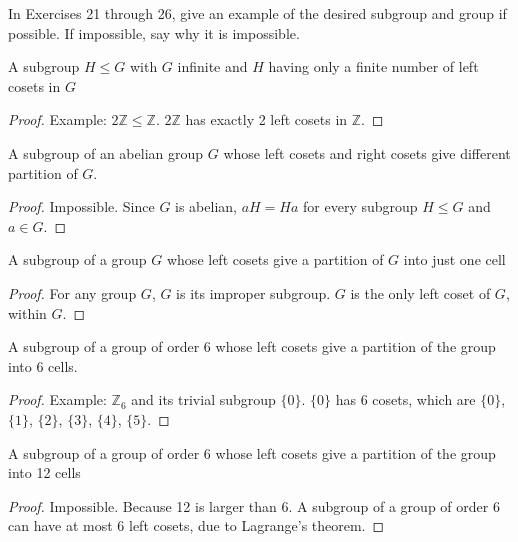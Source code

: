 In Exercises 21 through 26, give an example of the desired subgroup and group if possible. If impossible, say why
it is impossible.

\begin{exercise}
    A subgroup $H\leq G$ with $G$ infinite and $H$ having only a finite number of left cosets in $G$
\end{exercise}

\begin{proof}
    Example: $2\mathbb{Z} \leq \mathbb{Z}$. $2\mathbb{Z}$ has exactly 2 left cosets in $\mathbb{Z}$.
\end{proof}

\begin{exercise}
    A subgroup of an abelian group $G$ whose left cosets and right cosets give different partition of $G$.
\end{exercise}

\begin{proof}
    Impossible. Since $G$ is abelian, $aH = Ha$ for every subgroup $H\leq G$ and $a\in G$.
\end{proof}

\begin{exercise}
    A subgroup of a group $G$ whose left cosets give a partition of $G$ into just one cell
\end{exercise}

\begin{proof}
    For any group $G$, $G$ is its improper subgroup. $G$ is the only left coset of $G$, within $G$.
\end{proof}

\begin{exercise}
    A subgroup of a group of order 6 whose left cosets give a partition of the group into 6 cells.
\end{exercise}

\begin{proof}
    Example: $\mathbb{Z}_{6}$ and its trivial subgroup $\{0\}$. $\{0\}$ has 6 cosets, which are $\{0\}$, $\{1\}$, $\{2\}$, $\{3\}$, $\{4\}$, $\{5\}$.
\end{proof}

\begin{exercise}
    A subgroup of a group of order 6 whose left cosets give a partition of the group into 12 cells
\end{exercise}

\begin{proof}
    Impossible. Because 12 is larger than 6. A subgroup of a group of order 6 can have at most 6 left cosets, due to Lagrange's theorem.
\end{proof}

